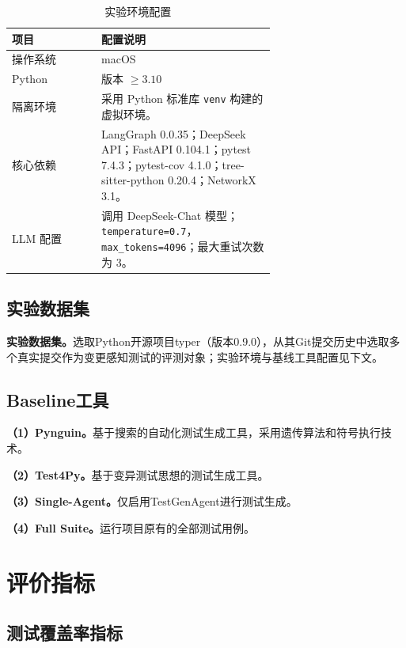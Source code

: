 \begin{table}[htbp]
    \centering
    \caption{实验环境配置}
    \label{tab:exp_env_config}
    \begin{tabular}{l>{\raggedright\arraybackslash}p{0.66\linewidth}}
        \toprule
        \textbf{项目} & \textbf{配置说明} \\
        \midrule
        操作系统 & macOS \\
        Python & 版本 $\geq 3.10$\\
        隔离环境 & 采用 Python 标准库 \texttt{venv} 构建的虚拟环境。 \\
        核心依赖 & LangGraph 0.0.35；DeepSeek API；FastAPI 0.104.1；pytest 7.4.3；pytest-cov 4.1.0；tree-sitter-python 0.20.4；NetworkX 3.1。 \\
        LLM 配置 & 调用 DeepSeek-Chat 模型；\texttt{temperature=0.7}，\texttt{max\_tokens=4096}；最大重试次数为 3。 \\
        \bottomrule
    \end{tabular}
\end{table}

\subsection{实验数据集}
\label{ssec:dataset}

\textbf{实验数据集。}选取Python开源项目typer（版本0.9.0），从其Git提交历史中选取多个真实提交作为变更感知测试的评测对象；实验环境与基线工具配置见下文。

\subsection{Baseline工具}
\label{ssec:baseline_tools}

\textbf{（1）Pynguin。}基于搜索的自动化测试生成工具，采用遗传算法和符号执行技术。

\textbf{（2）Test4Py。}基于变异测试思想的测试生成工具。

\textbf{（3）Single-Agent。}仅启用TestGenAgent进行测试生成。

\textbf{（4）Full Suite。}运行项目原有的全部测试用例。

\section{评价指标}
\label{sec:metrics}

\subsection{测试覆盖率指标}
\label{ssec:coverage_metrics}

